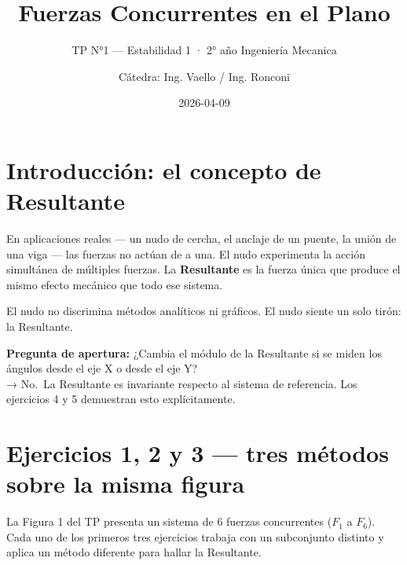 \documentclass[
  spanish,
  11pt,
  a4paper,
]{article}
\title{Fuerzas Concurrentes en el Plano}
\subtitle{TP N°1 --- Estabilidad 1 · 2° año Ingeniería Mecanica}
\author{Cátedra: Ing. Vaello / Ing. Ronconi}
\date{2026-04-09}
\renewcommand*\contentsname{Tabla de contenidos}
\newcommand\contentsname{Tabla de contenidos}
\begin{document}
\maketitle

\renewcommand*\contentsname{Tabla de contenidos}
{
\hypersetup{linkcolor=}
\setcounter{tocdepth}{3}
\tableofcontents
}

\section{Introducción: el concepto de
Resultante}\label{introducciuxf3n-el-concepto-de-resultante}

En aplicaciones reales --- un nudo de cercha, el anclaje de un puente,
la unión de una viga --- las fuerzas no actúan de a una. El nudo
experimenta la acción simultánea de múltiples fuerzas. La
\textbf{Resultante} es la fuerza única que produce el mismo efecto
mecánico que todo ese sistema.

\begin{tcolorbox}[enhanced jigsaw, bottomrule=.15mm, bottomtitle=1mm, titlerule=0mm, leftrule=.75mm, rightrule=.15mm, title=\textcolor{quarto-callout-note-color}{\faInfo}\hspace{0.5em}{Nota}, coltitle=black, colframe=quarto-callout-note-color-frame, left=2mm, opacitybacktitle=0.6, opacityback=0, toptitle=1mm, toprule=.15mm, colbacktitle=quarto-callout-note-color!10!white, colback=white, breakable, arc=.35mm]

El nudo no discrimina métodos analíticos ni gráficos. El nudo siente un
solo tirón: la Resultante.

\end{tcolorbox}

\textbf{Pregunta de apertura:} ¿Cambia el módulo de la Resultante si se
miden los ángulos desde el eje X o desde el eje Y?\\
→ No.~La Resultante es invariante respecto al sistema de referencia. Los
ejercicios 4 y 5 demuestran esto explícitamente.

\section{Ejercicios 1, 2 y 3 --- tres métodos sobre la misma
figura}\label{ejercicios-1-2-y-3-tres-muxe9todos-sobre-la-misma-figura}

La Figura 1 del TP presenta un sistema de 6 fuerzas concurrentes
(\(F_1\) a \(F_6\)). Cada uno de los primeros tres ejercicios trabaja
con un subconjunto distinto y aplica un método diferente para hallar la
Resultante.
\end{document}
